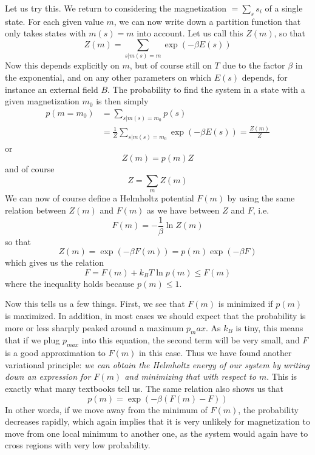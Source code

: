 \documentclass[a4paper, draft]{article}
\theoremstyle{own}
\theoremstyle{remark}
\begin{document}
Let us try this. We return to considering the magnetization $ = \sum_s s_i$ of a single state. For each given value $m$, we can now write down a partition function that only takes states with $m(s) = m$ into account. Let us call this $Z(m)$, so that
$$
Z(m) = \sum_{s | m(s) = m} \exp(-\beta E(s))
$$
Now this depends explicitly on $m$, but of course still on $T$ due to the factor $\beta$ in the exponential, and on any other parameters on which $E(s)$ depends, for instance an external field $B$. The probability to find the system in a state with a given magnetization $m_0$ is then simply
\begin{align*}
p(m = m_0) &= \sum_{s | m(s) = m_0} p(s)\\
&= \frac{1}{Z} \sum_{s | m(s) = m_0} \exp(-\beta E(s)) = \frac{Z(m)}{Z}
\end{align*}
or
$$
Z(m) = p(m) Z
$$
and of course
$$
Z = \sum_m Z(m)
$$
We can now of course define a Helmholtz potential $F(m)$ by using the same relation between $Z(m)$ and $F(m)$ as we have between $Z$ and $F$, i.e. 
$$
F(m) = - \frac{1}{\beta} \ln Z(m)
$$
so that
$$
Z(m) = \exp(-\beta F(m)) = p(m) \exp(-\beta F)
$$
which gives us the relation
$$
F = F(m) + k_B T \ln p(m) \leq F(m)
$$
where the inequality holds because $p(m) \leq 1$. 

Now this tells us a few things. First, we see that $F(m)$ is minimized if $p(m)$ is maximized. In addition, in most cases we should expect that the probability is more or less sharply peaked around a maximum $p_max$. As $k_B$ is tiny, this means that if we plug $p_{max}$ into this equation, the second term will be very small, and $F$ is a good approximation to $F(m)$ in this case. Thus we have found another variational principle: {\em we can obtain the Helmholtz energy of our system by writing down an expression for $F(m)$ and minimizing that with respect to $m$}. This is exactly what many textbooks tell us. The same relation also shows us that 
$$
p(m) = \exp(-\beta(F(m) - F))
$$
In other words, if we move away from the minimum of $F(m)$, the probability decreases rapidly, which again implies that it is very unlikely for magnetization to move from one local minimum to another one, as the system would again have to cross regions with very low probability. 
\end{document}

